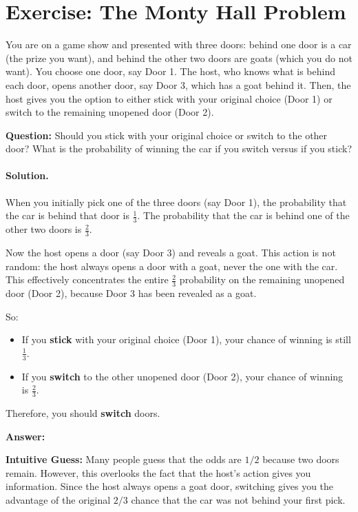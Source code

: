 \documentclass[11pt]{article}
\newif\ifshowanswers
\begin{document}
\section{Exercise: The Monty Hall Problem}

You are on a game show and presented with three doors: behind one door is a car (the prize you want), and behind the other two doors are goats (which you do not want). You choose one door, say Door 1. The host, who knows what is behind each door, opens another door, say Door 3, which has a goat behind it.
Then, the host gives you the option to either stick with your original choice (Door 1) or switch to the remaining unopened door (Door 2).

\noindent
\textbf{Question:} Should you stick with your original choice or switch to the other door? What is the probability of winning the car if you switch versus if you stick?

\ifshowanswers
\paragraph{Solution.}

When you initially pick one of the three doors (say Door 1), the probability that the car is behind that door is $\frac{1}{3}$.
The probability that the car is behind one of the other two doors is $\frac{2}{3}$.

Now the host opens a door (say Door 3) and reveals a goat. This action is not random: the host always opens a door with a goat, never the one with the car.
This effectively concentrates the entire $\frac{2}{3}$ probability on the remaining unopened door (Door 2), because Door 3 has been revealed as a goat.

So:

\begin{itemize}
  \item If you \textbf{stick} with your original choice (Door 1), your chance of winning is still $\frac{1}{3}$.
  \item If you \textbf{switch} to the other unopened door (Door 2), your chance of winning is $\frac{2}{3}$.
\end{itemize}

Therefore, you should \textbf{switch} doors.

\noindent
\textbf{Answer:} 

\noindent
\textbf{Intuitive Guess:} Many people guess that the odds are $1/2$ because two doors remain. However, this overlooks the fact that the host's action gives you information. Since the host always opens a goat door, switching gives you the advantage of the original $2/3$ chance that the car was not behind your first pick.
\end{document}
